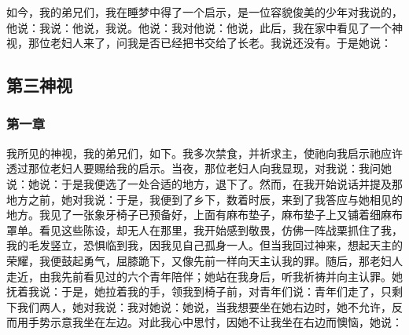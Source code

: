 如今，我的弟兄们，我在睡梦中得了一个启示，是一位容貌俊美的少年对我说的，他说：我说：他说，我说。他说：我对他说：他说，此后，我在家中看见了一个神视，那位老妇人来了，问我是否已经把书交给了长老。我说还没有。于是她说：\par


\subsection{第三神视}

\par


\subsubsection{第一章}

我所见的神视，我的弟兄们，如下。我多次禁食，并祈求主，使祂向我启示祂应许透过那位老妇人要赐给我的启示。当夜，那位老妇人向我显现，对我说：我问她说：她说：于是我便选了一处合适的地方，退下了。然而，在我开始说话并提及那地方之前，她对我说：于是，我便到了乡下，数着时辰，来到了我答应与她相见的地方。我见了一张象牙椅子已预备好，上面有麻布垫子，麻布垫子上又铺着细麻布罩单。看见这些陈设，却无人在那里，我开始感到敬畏，仿佛一阵战栗抓住了我，我的毛发竖立，恐惧临到我，因我见自己孤身一人。但当我回过神来，想起天主的荣耀，我便鼓起勇气，屈膝跪下，又像先前一样向天主认我的罪。随后，那老妇人走近，由我先前看见过的六个青年陪伴；她站在我身后，听我祈祷并向主认罪。她抚着我说：于是，她拉着我的手，领我到椅子前，对青年们说：青年们走了，只剩下我们两人，她对我说：我对她说：她说，当我想要坐在她右边时，她不允许，反而用手势示意我坐在左边。对此我心中思忖，因她不让我坐在右边而懊恼，她说：\par

